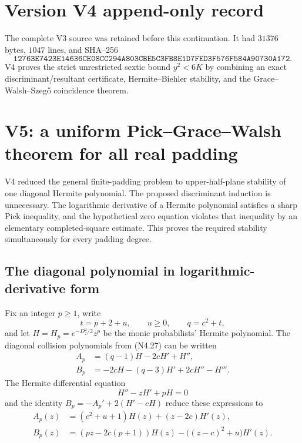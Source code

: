 \documentclass[11pt]{article}
\theoremstyle{definition}
\theoremstyle{remark}
\begin{document}
\section*{Version V4 append-only record}
The complete V3 source was retained before this continuation.  It had
\(31376\) bytes, \(1047\) lines, and SHA--256
\[
 \texttt{12763E7423E14636CE08CC294A803CBE5C3FB8E1D7FED3F576F584A90730A172}.
\]
V4 proves the strict unrestricted sextic bound \(y^2<6K\) by combining an
exact discriminant/resultant certificate, Hermite--Biehler stability, and
the Grace--Walsh--Szeg\H{o} coincidence theorem.




\section{V5: a uniform Pick--Grace--Walsh theorem for all real padding}
\label{sec:grh-v5}

V4 reduced the general finite-padding problem to upper-half-plane stability
of one diagonal Hermite polynomial.  The proposed discriminant induction is
unnecessary.  The logarithmic derivative of a Hermite polynomial satisfies
a sharp Pick inequality, and the hypothetical zero equation violates that
inequality by an elementary completed-square estimate.  This proves the
required stability simultaneously for every padding degree.

\subsection{The diagonal polynomial in logarithmic-derivative form}

Fix an integer \(p\ge1\), write
\[
 t=p+2+u,\qquad u\ge0,\qquad q=c^2+t,
 \tag{N5.1}
\]
and let \(H=H_p=e^{-D_z^2/2}z^p\) be the monic probabilists' Hermite
polynomial.  The diagonal collision polynomials from
\textup{(N4.27)} can be written
\[
\begin{aligned}
 A_p&=(q-1)H-2cH'+H'',\\
 B_p&=-2cH-(q-3)H'+2cH''-H'''.
\end{aligned}
\tag{N5.2}
\]
The Hermite differential equation
\[
 H''-zH'+pH=0
 \tag{N5.3}
\]
and the identity \(B_p=-A_p'+2(H'-cH)\) reduce these expressions to
\[
\boxed{
\begin{aligned}
 A_p(z)&=(c^2+u+1)H(z)+(z-2c)H'(z),\\
 B_p(z)&=(pz-2c(p+1))H(z)
 -\bigl((z-c)^2+u\bigr)H'(z).
\end{aligned}}
\tag{N5.4}
\]
\end{document}
